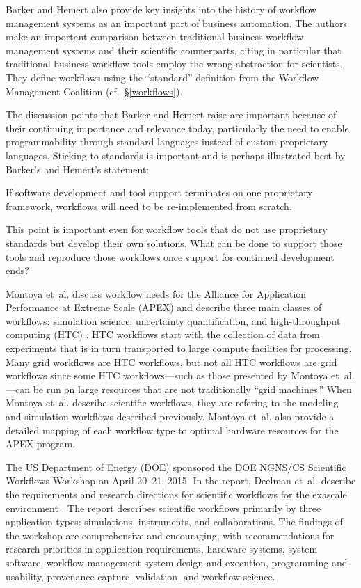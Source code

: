 Barker and Hemert also provide key insights into the history of workflow
management systems as an important part of business automation. The authors make
an important comparison between traditional business workflow management systems
and their scientific counterparts, citing in particular that traditional
business workflow tools employ the wrong abstraction for scientists. They define
workflows using the ``standard'' definition from the Workflow Management
Coalition (cf.~\S \ref{workflows}).

The discussion points that Barker and Hemert raise are important because of
their continuing importance and relevance today, particularly the need to enable
programmability through standard languages instead of custom proprietary
languages. Sticking to standards is important and is perhaps illustrated best
by Barker's and Hemert's statement:

\begin{displayquote} If software development and tool support terminates on one
proprietary framework, workflows will need to be re-implemented from scratch.
\end{displayquote}

This point is important even for workflow tools that do not use proprietary
standards but develop their own solutions. What can be done to support those
tools and reproduce those workflows once support for continued development ends?

Montoya et~al. discuss workflow needs for the Alliance for Application
Performance at Extreme Scale (APEX) \cite{nersc_apex_2016} and describe three
main classes of workflows: simulation science, uncertainty quantification,
and high-throughput computing (HTC) \cite{montoya_apex_2016}.  HTC workflows
start with the collection of data from experiments that is in turn transported
to large compute facilities for processing. Many grid workflows are HTC
workflows, but not all HTC workflows are grid workflows since some HTC
workflows---such as those presented by Montoya et~al.---can be run on large
resources that are not traditionally ``grid machines.'' When Montoya et~al.
describe scientific workflows, they are refering to the modeling and simulation
workflows described previously. Montoya et~al. also provide a detailed mapping
of each workflow type to optimal hardware resources for the APEX program.

The US Department of Energy (DOE) sponsored the DOE NGNS/CS Scientific
Workflows Workshop on April 20--21, 2015. In the report, Deelman et~al.
describe the requirements and research directions for scientific workflows for
the exascale environment \cite{deelman_future_2015}\cite{deelman_future_2017}.
The report describes scientific workflows primarily by three
application types: simulations, instruments, and collaborations. The findings of
the workshop are comprehensive and encouraging, with recommendations for
research priorities in application requirements, hardware systems, system
software, workflow management system design and execution, programming and
usability, provenance capture, validation, and workflow science.

